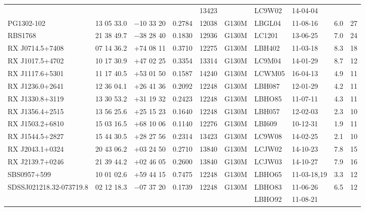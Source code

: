 \begin{landscape}
\begin{center}
\begin{longtable}{l l l l l l l l l l}
						&		       &			&		 	& 13423	&			&   LC9W02	& 14-04-04		   &	       &	  	   \\
PG1302-102  				&  13 05 33.0  &  $-$10 33 20	&   0.2784  	& 12038	&   G130M	&   LBGL04	& 11-08-16  		   &  6.0   &      27         \\
RBS1768  				&  21 38 49.7  &  $-$38 28 40	&   0.1830  	& 12936	&   G130M	&   LC1201	& 13-06-25		   &  7.0   &      24         \\
RX J0714.5+7408  			&  07 14 36.2  &  +74 08 11	&   0.3710  	& 12275	&   G130M	&   LBH402	& 11-03-18   		   &  8.3   &      18         \\
RX J1017.5+4702  			&  10 17 30.9  &  +47 02 25	&   0.3354  	& 13314	&   G130M	&   LC9M04	& 14-01-29		   &  8.7   &      12         \\
RX J1117.6+5301  			&  11 17 40.5  &  +53 01 50	&   0.1587  	& 14240	&   G130M	&   LCWM05	& 16-04-13		   &  4.9   &      11         \\
RX J1236.0+2641  			&  12 36 04.1  &  +26 41 36	&   0.2092  	& 12248	&   G130M	&   LBH087	& 12-01-29  		   &  4.2   &      11         \\
RX J1330.8+3119  			&  13 30 53.2  &  +31 19 32	&   0.2423  	& 12248	&   G130M	&   LBHO85	& 11-07-11		   &   4.3  &      11         \\
RX J1356.4+2515  			&  13 56 25.6  &  +25 15 23	&   0.1640  	& 12248	&   G130M	&   LBH057	& 12-02-03		   &   2.3  &      10         \\
RX J1503.2+6810  			&  15 03 16.5  &  +68 10 06	&   0.1140  	& 12276	&   G130M	&   LBI609		& 10-12-31 		   &   1.9  &      11         \\
RX J1544.5+2827  			&  15 44 30.5  &  +28 27 56	&   0.2314  	& 13423	&   G130M	&   LC9W08	& 14-02-25		   &   2.1  &      10         \\
RX J2043.1+0324  			&  20 43 06.2  &  +03 24 50	&   0.2710  	& 13840	&   G130M	&   LCJW02	& 14-10-23		   &   7.8  &      15         \\
RX J2139.7+0246  			&  21 39 44.2  &  +02 46 05	&   0.2600  	& 13840	&   G130M	&   LCJW03	& 14-10-27  		   & 	7.9  &      16         \\
SBS0957+599         			&  10 01 02.6  &  +59 44 15	&   0.7475  	& 12248	&   G130M	&   LBHO65	& 11-03-18,19  		   &   3.3  &      12         \\
SDSSJ021218.32-073719.8  	&  02 12 18.3  &  $-$07 37 20	&   0.1739  	& 12248	&   G130M	&   LBHO83	& 11-06-26		   &   6.5  &      12         \\
				        	     	& 	  	       &			&    	  	 	&		&			&   LBHO92	& 11-08-21		   &          &                   \\

\end{longtable}
\end{center}
\end{landscape}
